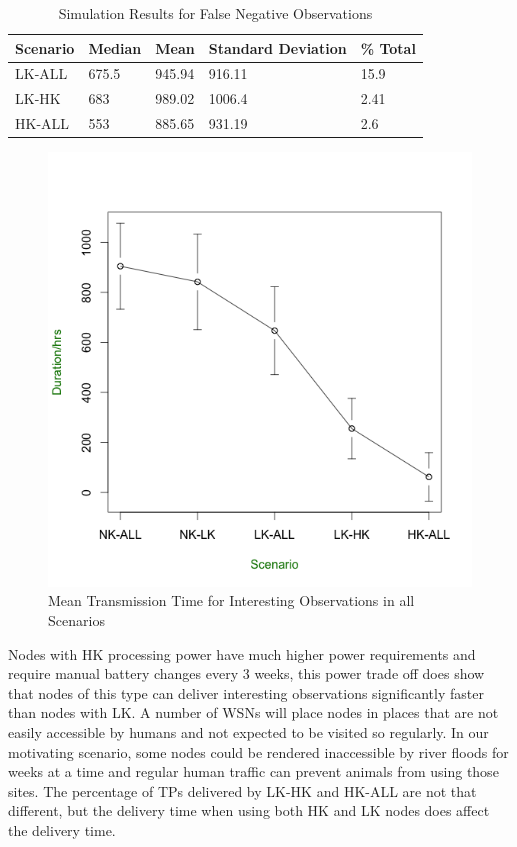 \begin{table}[h]\footnotesize
\begin{tabularx}{\textwidth}{ |X|X|X|X|X|}
\hline
Scenario & Median & Mean & Standard Deviation & \% Total\\
\hline
LK-ALL & 675.5 & 945.94 & 916.11 & 15.9\\ 
LK-HK & 683 & 989.02 & 1006.4 & 2.41\\
HK-ALL & 553 & 885.65 & 931.19 & 2.6\\
\hline
\end{tabularx}
\caption{Simulation Results for False Negative Observations}\label{tab:observ_fn}
\end{table}

\begin{figure}[h]
\centering
\includegraphics[width=\textwidth]{Chap7/figures/scen_int}
\caption{Mean Transmission Time for Interesting Observations in all Scenarios}
\label{fig:obs_int}
\end{figure}
	
Nodes with HK processing power have much higher power requirements and require manual battery changes every 3 weeks, this power trade off does show that nodes of this type can deliver interesting observations significantly faster than nodes with LK. A number of WSNs will place nodes in places that are not easily accessible by humans and not expected to be visited so regularly. In our motivating scenario, some nodes could be rendered inaccessible by river floods for weeks at a time and regular human traffic can prevent animals from using those sites. The percentage of TPs delivered by LK-HK and HK-ALL are not that different, but the delivery time when using both HK and LK nodes does affect the delivery time. 

